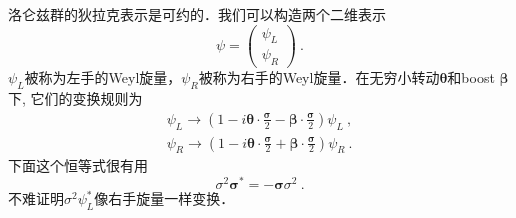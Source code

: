 
洛仑兹群的狄拉克表示是可约的．我们可以构造两个二维表示
\begin{equation}
\psi = \begin{pmatrix}
\psi_L \\
\psi_R
\end{pmatrix}~.
\end{equation}
$\psi_L$被称为左手的Weyl旋量，$\psi_R$被称为右手的Weyl旋量．在无穷小转动$\mathbf \theta$和boost $\mathbf \beta$下, 它们的变换规则为
\begin{align}
\psi_L \rightarrow (1-i \boldsymbol \theta \cdot \frac{\boldsymbol \sigma}{2} - \boldsymbol \beta \cdot \frac{\boldsymbol \sigma}{2})\psi_L ~, \\
\psi_R \rightarrow (1-i\boldsymbol \theta \cdot \frac{\boldsymbol \sigma}{2}+ \boldsymbol \beta \cdot \frac{\boldsymbol \sigma}{2})\psi_R ~.
\end{align}
下面这个恒等式很有用
\begin{equation}
\sigma^2\boldsymbol \sigma^* = - \boldsymbol \sigma \sigma^2~.
\end{equation}
不难证明$\sigma^2\psi^*_L$像右手旋量一样变换．